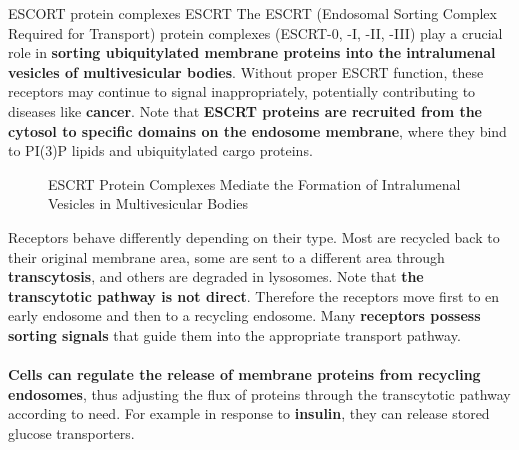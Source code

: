 \documentclass[../main.tex]{subfiles}
\begin{document}
\begin{RemarkWithTitel}{ESCORT protein complexes}
	\gls{ESCRT}
	The ESCRT (Endosomal Sorting Complex Required for Transport) protein complexes (ESCRT-0, -I, -II, -III) play a crucial role in \textbf{sorting ubiquitylated membrane proteins into the intralumenal vesicles of multivesicular bodies}. Without proper ESCRT function, these receptors may continue to signal inappropriately, potentially contributing to diseases like \textbf{cancer}. Note that \textbf{ESCRT proteins are recruited from the cytosol to specific domains on the endosome membrane}, where they bind to PI(3)P lipids and ubiquitylated cargo proteins.
\end{RemarkWithTitel}

\begin{figure}[H]
	\centering
	\caption{ESCRT Protein Complexes Mediate the Formation of Intralumenal Vesicles in Multivesicular Bodies}
\end{figure}
Receptors behave differently depending on their type. Most are recycled back to their original membrane area, some are sent to a different area through \textbf{\gls{transcytosis}}, and others are degraded in lysosomes. Note that \textbf{the transcytotic pathway is not direct}. Therefore the receptors move first to en early endosome and then to a recycling endosome. Many \textbf{receptors possess sorting signals} that guide them into the appropriate transport pathway. \\
\\
\textbf{Cells can regulate the release of membrane proteins from recycling endosomes}, thus adjusting the flux of proteins through the transcytotic pathway according to need. For example in response to \textbf{insulin}, they can release stored glucose transporters. 
\end{document}
